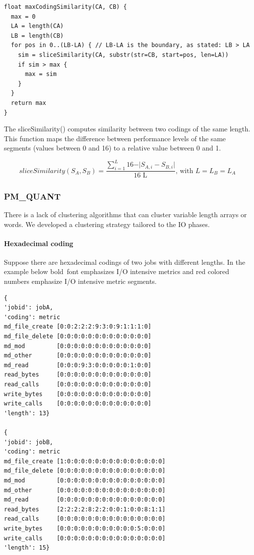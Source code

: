 \documentclass[]{llncs}
\begin{document}
\begin{lstlisting}
float maxCodingSimilarity(CA, CB) { 
  max = 0
  LA = length(CA)
  LB = length(CB)
  for pos in 0..(LB-LA) { // LB-LA is the boundary, as stated: LB > LA
    sim = sliceSimilarity(CA, substr(str=CB, start=pos, len=LA))
    if sim > max {
      max = sim
    }
  }
  return max
}
\end{lstlisting}

The sliceSimilarity() computes similarity between two codings of the same length.
This function maps the difference between performance levels of the same segments (values between 0 and 16) to a relative value between 0 and 1.

\begin{equation}
sliceSimilarity \left( S_{A},S_{B} \right) =\frac{ \sum _{i=1}^{L_{}}16 - \vert S_{A,i}-S_{B,i} \vert }{\text{16 L}_{}}\text{, with }L=L_{B}=L_{A}
\end{equation}

\subsubsection{PM\_QUANT}
There is a lack of clustering algorithms that can cluster variable length arrays or words.
We developed a clustering strategy tailored to the IO phases.

\paragraph{Hexadecimal coding}
Suppose there are hexadecimal codings of two jobs with different lengths.
In the example below bold\ font emphasizes I/O intensive  metrics and red colored numbers emphasize I/O intensive metric segments.


\begin{lstlisting}
{ 
'jobid': jobA,
'coding': metric
md_file_create [0:0:2:2:2:9:3:0:9:1:1:1:0]
md_file_delete [0:0:0:0:0:0:0:0:0:0:0:0:0]
md_mod         [0:0:0:0:0:0:0:0:0:0:0:0:0]
md_other       [0:0:0:0:0:0:0:0:0:0:0:0:0]
md_read        [0:0:0:9:3:0:0:0:0:0:1:0:0]
read_bytes     [0:0:0:0:0:0:0:0:0:0:0:0:0]
read_calls     [0:0:0:0:0:0:0:0:0:0:0:0:0]
write_bytes    [0:0:0:0:0:0:0:0:0:0:0:0:0]
write_calls    [0:0:0:0:0:0:0:0:0:0:0:0:0]
'length': 13} 

{ 
'jobid': jobB,
'coding': metric
md_file_create [1:0:0:0:0:0:0:0:0:0:0:0:0:0:0]
md_file_delete [0:0:0:0:0:0:0:0:0:0:0:0:0:0:0]
md_mod         [0:0:0:0:0:0:0:0:0:0:0:0:0:0:0]
md_other       [0:0:0:0:0:0:0:0:0:0:0:0:0:0:0]
md_read        [0:0:0:0:0:0:0:0:0:0:0:0:0:0:0]
read_bytes     [2:2:2:2:8:2:2:0:0:1:0:0:8:1:1]
read_calls     [0:0:0:0:0:0:0:0:0:0:0:0:0:0:0]
write_bytes    [0:0:0:0:0:0:0:0:0:0:0:5:0:0:0]
write_calls    [0:0:0:0:0:0:0:0:0:0:0:0:0:0:0]
'length': 15} 
\end{lstlisting}
\end{document}
